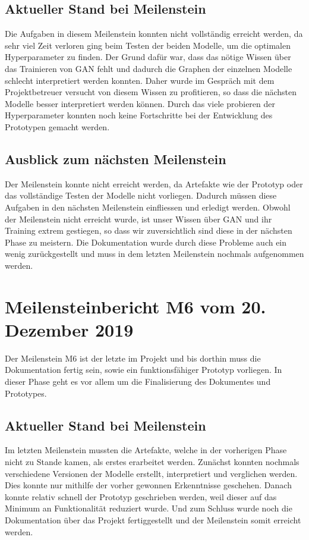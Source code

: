 \subsection{Aktueller Stand bei Meilenstein}
Die Aufgaben in diesem Meilenstein konnten nicht vollständig erreicht werden, da sehr viel Zeit verloren ging beim
Testen der beiden Modelle, um die optimalen Hyperparameter zu finden. Der Grund dafür war, dass das nötige Wissen über
das Trainieren von \gls{GAN} fehlt und dadurch die Graphen der einzelnen Modelle schlecht interpretiert werden konnten. Daher
wurde im Gespräch mit dem Projektbetreuer versucht von diesem Wissen zu profitieren, so dass die nächsten Modelle besser
interpretiert werden können. Durch das viele probieren der Hyperparameter konnten noch keine Fortschritte bei der
Entwicklung des Prototypen gemacht werden.

\subsection{Ausblick zum nächsten Meilenstein}
Der Meilenstein konnte nicht erreicht werden, da Artefakte wie der Prototyp oder das vollständige Testen der Modelle
nicht vorliegen. Dadurch müssen diese Aufgaben in den nächsten Meilenstein einfliessen und erledigt werden. Obwohl der
Meilenstein nicht erreicht wurde, ist unser Wissen über \gls{GAN} und ihr Training extrem gestiegen, so dass wir
zuversichtlich sind diese in der nächsten Phase zu meistern. Die Dokumentation wurde durch diese Probleme auch ein wenig
zurückgestellt und muss in dem letzten Meilenstein nochmals aufgenommen werden.

\section{Meilensteinbericht M6 vom 20. Dezember 2019}
Der Meilenstein M6 ist der letzte im Projekt und bis dorthin muss die Dokumentation fertig sein, sowie ein
funktionsfähiger Prototyp vorliegen. In dieser Phase geht es vor allem um die Finalisierung des Dokumentes und
Prototypes.

\subsection{Aktueller Stand bei Meilenstein}
Im letzten Meilenstein mussten die Artefakte, welche in der vorherigen Phase nicht zu Stande kamen, als erstes
erarbeitet werden. Zunächst konnten nochmals verschiedene Versionen der Modelle erstellt, interpretiert und verglichen
werden. Dies konnte nur mithilfe der vorher gewonnen Erkenntnisse geschehen. Danach konnte relativ schnell der Prototyp
geschrieben werden, weil dieser auf das Minimum an Funktionalität reduziert wurde. Und zum Schluss wurde noch die
Dokumentation über das Projekt fertiggestellt und der Meilenstein somit erreicht werden.

